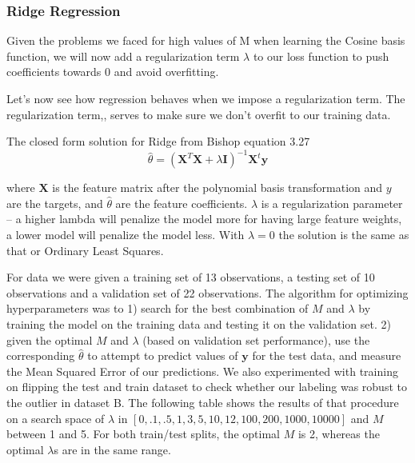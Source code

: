 \documentclass[10pt]{article}
\begin{document}
\subsubsection*{Ridge Regression}

Given the problems we faced for high values of M when learning the Cosine basis function, we will now add a regularization term  $\lambda$ to our loss function to push coefficients towards 0 and avoid overfitting. 

Let's now see how regression behaves when we impose a regularization term. The regularization term,, serves to make sure we don't overfit to our training data. 

The closed form solution for Ridge from Bishop equation 3.27
\begin{equation}
\hat{\theta} = (\mathbf{X}^T\mathbf{X} + \lambda \mathbf{I})^{-1}\mathbf{X}^t\mathbf{y}
\end{equation}

\noindent where $\mathbf{X}$ is the feature matrix after the polynomial basis transformation and  $y$ are the targets, and $\hat{\theta}$ are the feature coefficients. $\lambda$ is a regularization parameter --  a higher lambda will penalize the model more for having large feature weights, a lower model will penalize the model less. With $\lambda =0$ the solution is the same as that or Ordinary Least Squares.

For data we were given a training set of 13 observations, a testing set of 10 observations and a validation set of 22 observations. The algorithm for optimizing hyperparameters was to 1) search for the best combination of $M$ and $\lambda$ by training the model on the training data and testing it on the validation set. 2) given the optimal  $M$ and $\lambda$  (based on validation set performance), use the corresponding $\hat{\theta}$ to attempt to predict values of $\mathbf{y}$ for the test data, and measure the Mean Squared Error of our predictions. We also experimented with training on flipping the test and train dataset to check whether our labeling was robust to the outlier in dataset B. The following table shows the results of that procedure on a search space of  $\lambda$ in $[0, .1, .5, 1, 3,5,10, 12, 100, 200, 1000, 10000]$ and $M$  between 1 and 5. For both train/test splits, the optimal $M$ is 2, whereas the optimal $\lambda$s are in the same range. 
\end{document}
